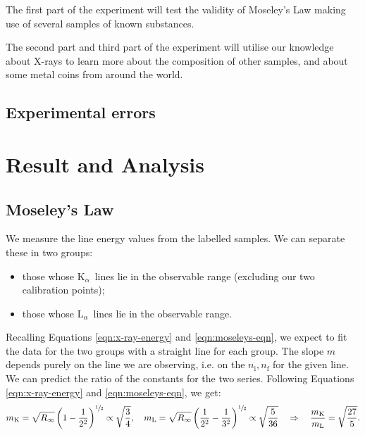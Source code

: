 \documentclass[11pt,a4paper,twoside,onecolumn]{article}
\newcommand{\rydberg}{R}
\newcommand{\Kalpha}{$\mathrm{K}_\alpha$~}
\newcommand{\Lalpha}{$\mathrm{L}_\alpha$~}
\begin{document}
The first part of the experiment will test the validity of Moseley's Law making use of several samples of known substances.

The second part and third part of the experiment will utilise our knowledge about X-rays to learn more about the composition of other samples, and about some metal coins from around the world.

\subsection{Experimental errors}

\section{Result and Analysis}

\subsection{Moseley's Law}
We measure the line energy values from the labelled samples. We can separate these in two groups:
\begin{itemize}[noitemsep]
    \item those whose \Kalpha lines lie in the observable range (excluding our two calibration points);
    \item those whose \Lalpha lines lie in the observable range.
\end{itemize}
Recalling Equations \eqref{eqn:x-ray-energy} and \eqref{eqn:moseleys-eqn}, we expect to fit the data for the two groups with a straight line for each group. The slope $m$ depends purely on the line we are observing, i.e. on the $n_\mathrm{i}, n_\mathrm{f}$ for the given line. We can predict the ratio of the constants for the two series. Following Equations \eqref{eqn:x-ray-energy} and \eqref{eqn:moseleys-eqn}, we get:
\begin{equation}
    m_\mathrm{K} = \sqrt{\rydberg_\infty} \left(1 - \frac{1}{2^2}\right)^{\sfrac{1}{2}} \propto \sqrt{\frac{3}{4}},\quad m_\mathrm{L} = \sqrt{\rydberg_\infty} \left(\frac{1}{2^2} - \frac{1}{3^2}\right)^{\sfrac{1}{2}} \propto \sqrt{\frac{5}{36}} \quad \Rightarrow \quad \frac{m_\mathrm{K}}{m_\mathrm{L}} = \sqrt{\frac{27}{5}}.
\end{equation}
\cite{}
\end{document}
